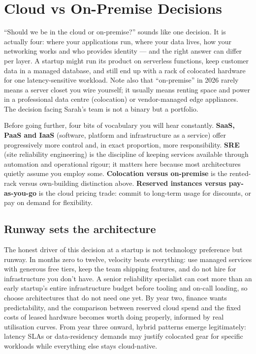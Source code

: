 \section{Cloud vs On-Premise Decisions}
``Should we be in the cloud or on-premise?'' sounds like one decision. It is actually four: where your applications run, where your data lives, how your networking works and who provides identity — and the right answer can differ per layer. A startup might run its product on serverless functions, keep customer data in a managed database, and still end up with a rack of colocated hardware for one latency-sensitive workload. Note also that ``on-premise'' in 2026 rarely means a server closet you wire yourself; it usually means renting space and power in a professional data centre (colocation) or vendor-managed edge appliances. The decision facing Sarah's team is not a binary but a portfolio.


Before going further, four bits of vocabulary you will hear constantly. \textbf{SaaS, PaaS and IaaS} (software, platform and infrastructure as a service) offer progressively more control and, in exact proportion, more responsibility. \textbf{SRE} (site reliability engineering) is the discipline of keeping services available through automation and operational rigour; it matters here because most architectures quietly assume you employ some. \textbf{Colocation versus on-premise} is the rented-rack versus own-building distinction above. \textbf{Reserved instances versus pay-as-you-go} is the cloud pricing trade: commit to long-term usage for discounts, or pay on demand for flexibility.



\subsection{Runway sets the architecture}


The honest driver of this decision at a startup is not technology preference but runway. In months zero to twelve, velocity beats everything: use managed services with generous free tiers, keep the team shipping features, and do not hire for infrastructure you don't have. A senior reliability specialist can cost more than an early startup's entire infrastructure budget before tooling and on-call loading, so choose architectures that do not need one yet. By year two, finance wants predictability, and the comparison between reserved cloud spend and the fixed costs of leased hardware becomes worth doing properly, informed by real utilisation curves. From year three onward, hybrid patterns emerge legitimately: latency SLAs or data-residency demands may justify colocated gear for specific workloads while everything else stays cloud-native.



